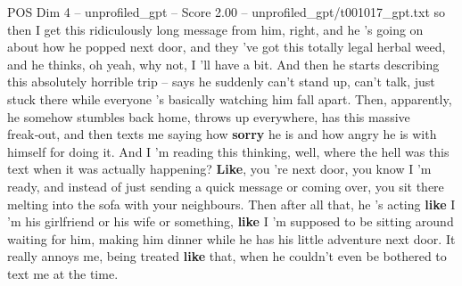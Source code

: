 \begin{textsample}{POS Dim 4 – unprofiled\_gpt – Score 2.00 – unprofiled\_gpt/t001017\_gpt.txt}  \label{ex:f4_pos_028}
so then I get this ridiculously long message from him, right, and he ’s going on about how he popped next door, and they ’ve got this totally legal herbal weed, and he thinks, oh yeah, why not, I ’ll have a bit.
And then he starts describing this absolutely horrible trip – says he suddenly can't stand up, can't talk, just stuck there while everyone ’s basically watching him fall apart.
Then, apparently, he somehow stumbles back home, throws up everywhere, has this massive freak‑out, and then texts me saying how \textbf{sorry} he is and how angry he is with himself for doing it.
And I ’m reading this thinking, well, where the hell was this text when it was actually happening? \textbf{Like}, you ’re next door, you know I ’m ready, and instead of just sending a quick message or coming over, you sit there melting into the sofa with your neighbours.
Then after all that, he ’s acting \textbf{like} I ’m his girlfriend or his wife or something, \textbf{like} I ’m supposed to be sitting around waiting for him, making him dinner while he has his little adventure next door.
It really annoys me, being treated \textbf{like} that, when he couldn't even be bothered to text me at the time.

\end{textsample}
